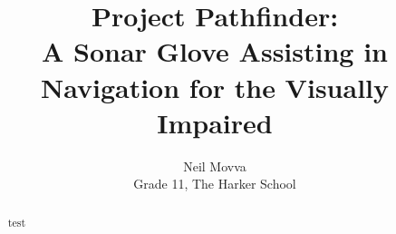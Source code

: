 \documentclass{article}
\title{Project Pathfinder:
\\
A Sonar Glove Assisting in Navigation for the Visually Impaired
}
\author{Neil Movva \\ Grade 11, The Harker School}
\begin{document}
\maketitle


\begin{abstract}

test

\end{abstract}
\end{document}
